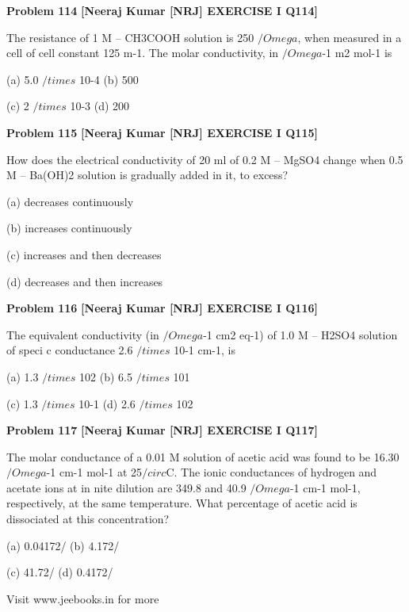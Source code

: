 \begin{problembox}
\textbf{Problem 114} \hfill \textbf{[Neeraj Kumar [NRJ] EXERCISE I Q114]}
\label{q:ext-nrj_all_questions-114}

The resistance of 1 M -- CH3COOH solution is 250 
$/Omega$, when measured in a cell of cell constant 125 
m-1. The molar conductivity, in $/Omega$-1 m2 mol-1 is
 
 (a) 5.0 $/times$ 10-4 
(b) 500
 
 (c) 2 $/times$ 10-3 
(d) 200
\end{problembox}

\begin{problembox}
\textbf{Problem 115} \hfill \textbf{[Neeraj Kumar [NRJ] EXERCISE I Q115]}
\label{q:ext-nrj_all_questions-115}

How does the electrical conductivity of 20 ml of 
0.2 M -- MgSO4 change when 0.5 M -- Ba(OH)2 
solution is gradually added in it, to excess?
 
 (a) decreases continuously
 
 (b) increases continuously
 
 (c) increases and then decreases
 
 (d) decreases and then increases
\end{problembox}

\begin{problembox}
\textbf{Problem 116} \hfill \textbf{[Neeraj Kumar [NRJ] EXERCISE I Q116]}
\label{q:ext-nrj_all_questions-116}

The equivalent conductivity (in $/Omega$-1 cm2 eq-1) of 
1.0 M -- H2SO4 solution of speci  c conductance 
2.6 $/times$ 10-1 cm-1, is
 
 (a) 1.3 $/times$ 102 
(b) 6.5 $/times$ 101
 
 (c) 1.3 $/times$ 10-1 
(d) 2.6 $/times$ 102
\end{problembox}

\begin{problembox}
\textbf{Problem 117} \hfill \textbf{[Neeraj Kumar [NRJ] EXERCISE I Q117]}
\label{q:ext-nrj_all_questions-117}

The molar conductance of a 0.01 M solution of 
acetic acid was found to be 16.30 $/Omega$-1 cm-1 mol-1 
at 25$/circ$C. The ionic conductances of hydrogen 
and acetate ions at in  nite dilution are 349.8 and 
40.9  $/Omega$-1 cm-1 mol-1, respectively, at the same 
temperature. What percentage of acetic acid is 
dissociated at this concentration?
 
 (a) 0.04172/%
(b) 4.172/%
 
 (c) 41.72/%
(d) 0.4172/%
 
 
Visit www.jeebooks.in for more
\end{problembox}

